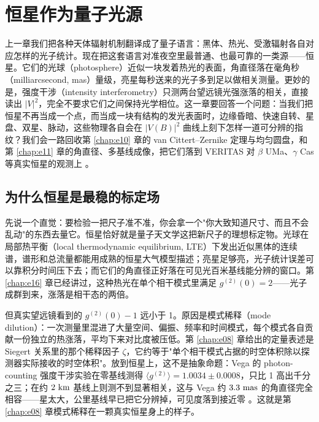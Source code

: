 \chapter{恒星作为量子光源}
\label{chap:e17}

\begin{chapteropening}
上一章我们把各种天体辐射机制翻译成了量子语言：黑体、热光、受激辐射各自对应怎样的光子统计。现在把这套语言对准夜空里最普通、也最可靠的一类源——恒星。它们的光球（photosphere）近似一块发着热光的表面，角直径落在毫角秒（milliarcsecond, mas）量级，亮星每秒送来的光子多到足以做相关测量。更妙的是，强度干涉（intensity interferometry）只测两台望远镜光强涨落的相关，直接读出 \(|V|^2\)，完全不要求它们之间保持光学相位。这一章要回答一个问题：当我们把恒星不再当成一个点，而当成一块有结构的发光表面时，边缘昏暗、快速自转、星盘、双星、脉动，这些物理各自会在 \(|V(B)|^2\) 曲线上刻下怎样一道可分辨的指纹？我们会一路回收第 \ref{chap:e10} 章的 van Cittert--Zernike 定理与均匀圆盘，和第 \ref{chap:e11} 章的角直径、多基线成像，把它们落到 VERITAS 对 \(\beta\) UMa、\(\gamma\) Cas 等真实恒星的观测上 \citep{1956Natur.177...27B,1974MNRAS.167..121H,1974iiia.book.....H,2020NatAs...4.1164A,2024MNRAS.529.4387A}。
\end{chapteropening}

\section{为什么恒星是最稳的标定场}
\label{sec:e17-why-stars}

先说一个直觉：要检验一把尺子准不准，你会拿一个"你大致知道尺寸、而且不会乱动"的东西去量它。恒星恰好就是量子天文学这把新尺子的理想标定物。光球在局部热平衡（local thermodynamic equilibrium, LTE）下发出近似黑体的连续谱，谱形和总流量都能用成熟的恒星大气模型描述；亮星足够亮，光子统计误差可以靠积分时间压下去；而它们的角直径正好落在可见光百米基线能分辨的窗口。第 \ref{chap:e16} 章已经讲过，这种热光在单个相干模式里满足 \(g^{(2)}(0)=2\)——光子成群到来，涨落是相干态的两倍。

但真实望远镜看到的 \(g^{(2)}(0)-1\) 远小于 1。原因是模式稀释（mode dilution）：一次测量里混进了大量空间、偏振、频率和时间模式，每个模式各自贡献一份独立的热涨落，平均下来对比度被压低。第 \ref{chap:e08} 章给出的定量表述是 Siegert 关系里的那个稀释因子 \(\zeta\)，它约等于"单个相干模式占据的时空体积除以探测器实际接收的时空体积"。放到恒星上，这不是抽象命题：Vega 的 photon-counting 强度干涉实验在零基线测得 \(\langle g^{(2)}\rangle=1.0034\pm0.0008\)，只比 1 高出千分之三；在约 \(2~{\rm km}\) 基线上则测不到显著相关，这与 Vega 约 \(3.3~{\rm mas}\) 的角直径完全相容——星太大，公里基线早已把它分辨掉，可见度落到接近零 \citep{2021MNRAS.506.1585Z}。这就是第 \ref{chap:e08} 章模式稀释在一颗真实恒星身上的样子。

